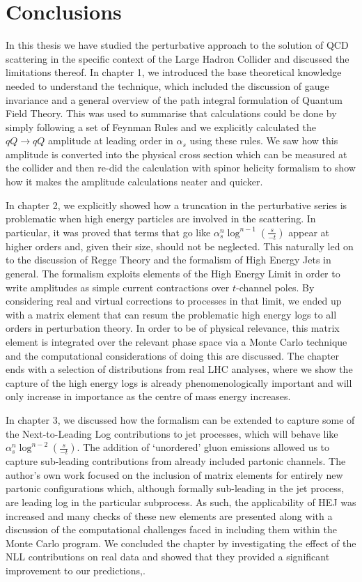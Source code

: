 \chapter{Conclusions}

In this thesis we have studied the perturbative approach to the solution of QCD scattering in the specific context of the Large Hadron Collider and discussed the limitations thereof. In chapter 1, we introduced the base theoretical knowledge needed to understand the technique, which included the discussion of gauge invariance and a general overview of the path integral formulation of Quantum Field Theory. This was used to summarise that calculations could be done by simply following a set of Feynman Rules and we explicitly calculated the $qQ \to qQ$ amplitude at leading order in $\alpha_s$ using these rules. We saw how this amplitude is converted into the physical cross section which can be measured at the collider and then re-did the calculation with spinor helicity formalism to show how it makes the amplitude calculations neater and quicker. 

In chapter 2, we explicitly showed how a truncation in the perturbative series is problematic when high energy particles are involved in the scattering. In particular, it was proved that terms that go like $\alpha_s^{n} \log^{n-1}\left(\frac{s}{-t} \right)$ appear at higher orders and, given their size, should not be neglected. This naturally led on to the discussion of Regge Theory and the formalism of High Energy Jets in general. The formalism exploits elements of the High Energy Limit in order to write amplitudes as simple current contractions over $t$-channel poles. By considering real and virtual corrections to processes in that limit, we ended up with a matrix element that can resum the problematic high energy logs to all orders in perturbation theory. In order to be of physical relevance, this matrix element is integrated over the relevant phase space via a Monte Carlo technique and the computational considerations of doing this are discussed. The chapter ends with a selection of distributions from real LHC analyses, where we show the capture of the high energy logs is already phenomenologically important and will only increase in importance as the centre of mass energy increases. 

In chapter 3, we discussed how the formalism can be extended to capture some of the Next-to-Leading Log contributions to jet processes, which will behave like $\alpha_s^{n} \log^{n-2}\left(\frac{s}{-t} \right)$. The addition of `unordered' gluon emissions allowed us to capture sub-leading contributions from already included partonic channels. The author's own work focused on the inclusion of matrix elements for entirely new partonic configurations which, although formally sub-leading in the jet process, are leading log in the particular subprocess. As such, the applicability of HEJ was increased and many checks of these new elements are presented along with a discussion of the computational challenges faced in including them within the Monte Carlo program. We concluded the chapter by investigating the effect of the NLL contributions on real data and showed that they provided a significant improvement to our predictions,. 

